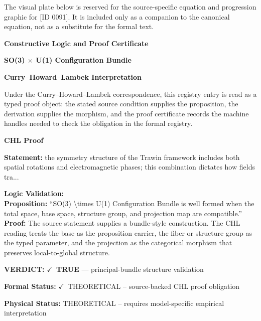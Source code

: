 \begingroup\footnotesize\sloppy
The visual plate below is reserved for the source-specific equation and progression graphic for [ID 0091]. It is included only as a companion to the canonical equation, not as a substitute for the formal text.
\par\endgroup
\ifTZPDarkEdition
{}
\fi

\clearpage
\begingroup\tzpsupportsetup
\noindent\textbf{\fontsize{10.8pt}{12.8pt}\selectfont [ID 0091] Constructive Logic and Proof Certificate}\par
\noindent\textbf{\fontsize{10pt}{12pt}\selectfont SO(3) $\times$ U(1) Configuration Bundle}\par
\vspace{0.45em}
\begingroup
\footnotesize
\setlength{\parskip}{0.22em}
\setlength{\parindent}{0pt}
\noindent\textbf{Curry--Howard--Lambek Interpretation}\par
Under the Curry--Howard--Lambek correspondence, this registry entry is read as a typed proof
object: the stated source condition supplies the proposition, the derivation supplies the
morphism, and the proof certificate records the machine handles needed to check the obligation
in the formal registry.

\vspace{0.45em}
\noindent\textbf{CHL Proof}\par
\textbf{Statement:} the symmetry structure of the Trawin framework includes both spatial rotations and
electromagnetic phases; this combination dictates how fields tra...

\textbf{Logic Validation:}\\
\textbf{Proposition:} ``SO(3) \textbackslash{}times U(1) Configuration Bundle is well formed when the total space, base
space, structure group, and projection map are compatible.''\\
\textbf{Proof:} The source statement supplies a bundle-style construction. The CHL reading treats the
base as the proposition carrier, the fiber or structure group as the typed parameter,
and the projection as the categorical morphism that preserves local-to-global structure.

\textbf{VERDICT:} \ensuremath{\checkmark}\ \textbf{TRUE} --- principal-bundle structure validation

\textbf{Formal Status:} \ensuremath{\checkmark}\ THEORETICAL -- source-backed CHL proof obligation

\textbf{Physical Status:} THEORETICAL -- requires model-specific empirical interpretation
\par\vspace{0.45em}
\par
\ifTZPDarkEdition
{}
\fi
\endgroup
\endgroup
